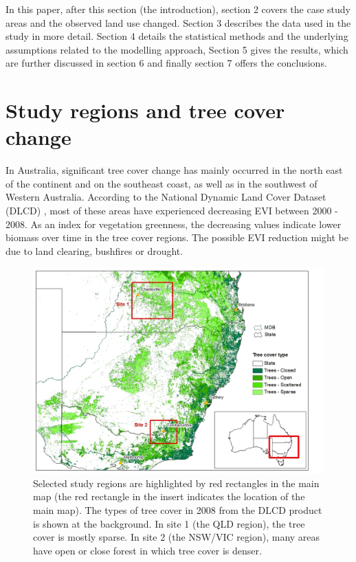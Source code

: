 \documentclass[draft,linenumbers]{agujournal}
\begin{document}
\begin{article}
In this paper, after this section (the introduction), section 2 covers the case study areas and the observed land use changed. Section 3 describes the data used in the study in more detail. Section 4 details the statistical methods and the underlying assumptions related to the modelling approach, Section 5 gives the results, which are further discussed in section 6 and finally section 7 offers the conclusions.  

\section{Study regions and tree cover change}

In Australia, significant tree cover change has mainly occurred in the north east of the continent and on the southeast coast, as well as in the southwest of Western Australia. According to the National Dynamic Land Cover Dataset (DLCD) \citep{Lymburner2010}, most of these areas have experienced decreasing EVI between 2000 - 2008. As an index for vegetation greenness, the decreasing values indicate lower biomass over time in the tree cover regions. The possible EVI reduction might be due to land clearing, bushfires or drought. 

\begin{figure}[htp]
  \centering
  \includegraphics[bb = 8 1 800 600,scale=0.5]{map_selreg.jpg}
  \caption{Selected study regions are highlighted by red rectangles in the main map (the red rectangle in the insert indicates the location of the main map). The types of tree cover in 2008 from the DLCD product is shown at the background. In site 1 (the QLD region), the tree cover is mostly sparse. In site 2 (the NSW/VIC region), many areas have open or close forest in which tree cover is denser.}
  \label{fig:sel_reg}
\end{figure}


\end{article}
\end{document}
